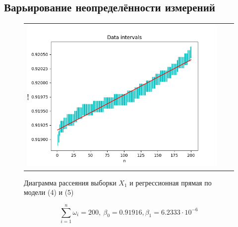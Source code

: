 \documentclass[a4paper,14pt]{article}
\begin{document}
	 \subsection{Варьирование неопределённости измерений}
	\begin{figure}[H]
		\begin{center}
			\begin{tabular}{ccc}
				\includegraphics[scale=0.7]{../image/data_and_intervals2.png}
			\end{tabular}
		\end{center}
		\caption{Диаграмма рассеяния выборки $X_1$ и регрессионная прямая по модели (4) и (5)} 
	\end{figure}
	\begin{equation*}
		\sum\limits_{i=1}^n \omega_i = 200,\ \beta_0 = 0.91916, \beta_1 = 6.2333 \cdot 10^{-6}
	\end{equation*}
\end{document}
